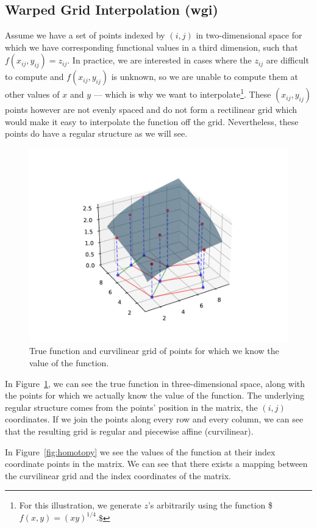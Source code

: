 \documentclass{article}
\begin{document}
\subsection{Warped Grid Interpolation (\acrshort{wgi})}

Assume we have a set of points indexed by $(i,j)$ in two-dimensional space for which we have corresponding functional values in a third dimension, such that $f(x_{ij},y_{ij}) = z_{ij}$. In practice, we are interested in cases where the $z_{ij}$ are difficult to compute and $f(x_{ij},y_{ij})$ is unknown, so we are unable to compute them at other values of $x$ and $y$ --- which is why we want to interpolate\footnote{For this illustration, we generate $z$'s arbitrarily using the function \$$f(x,y) = (xy)^{1/4}.$\$}. These $(x_{ij},y_{ij})$ points however are not evenly spaced and do not form a rectilinear grid which would make it easy to interpolate the function off the grid. Nevertheless, these points do have a regular structure as we will see.

\begin{figure}[!htbp]
\centering
\includegraphics[width=0.7\linewidth]{files/WarpedInterpolation-cc8847ada1a6681fb5683f7c00185ea4.pdf}
\caption[]{True function and curvilinear grid of points for which we know the value of the function.}
\label{fig:warped_interp}
\end{figure}

In Figure~\ref{fig:warped_interp}, we can see the true function in three-dimensional space, along with the points for which we actually know the value of the function. The underlying regular structure comes from the points' position in the matrix, the $(i,j)$ coordinates. If we join the points along every row and every column, we can see that the resulting grid is regular and piecewise affine (curvilinear).

In Figure~\ref{fig:homotopy} we see the values of the function at their index coordinate points in the matrix. We can see that there exists a mapping between the curvilinear grid and the index coordinates of the matrix.
\end{document}
